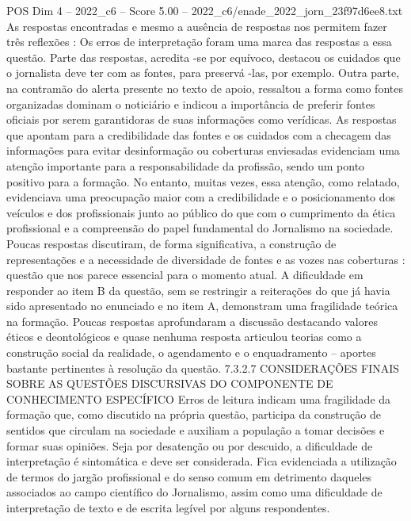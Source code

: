 \begin{textsample}{POS Dim 4 – 2022\_c6 – Score 5.00 – 2022\_c6/enade\_2022\_jorn\_23f97d6ee8.txt}
As respostas encontradas e mesmo a ausência de respostas nos permitem fazer três reflexões : Os erros de interpretação foram uma marca das respostas a essa questão.
Parte das respostas, acredita -se por equívoco, destacou os cuidados que o jornalista deve ter com as fontes, para preservá -las, por exemplo.
Outra parte, na contramão do alerta presente no texto de apoio, ressaltou a forma como fontes organizadas dominam o noticiário e indicou a importância de preferir fontes oficiais por serem garantidoras de suas informações como verídicas.
As respostas que apontam para a credibilidade das fontes e os cuidados com a checagem das informações para evitar desinformação ou coberturas enviesadas evidenciam uma atenção importante para a responsabilidade da profissão, sendo um ponto positivo para a formação.
No entanto, muitas vezes, essa atenção, como relatado, evidenciava uma preocupação maior com a credibilidade e o posicionamento dos veículos e dos profissionais junto ao público do que com o cumprimento da ética profissional e a compreensão do papel fundamental do Jornalismo na sociedade.
Poucas respostas discutiram, de forma significativa, a construção de representações e a necessidade de diversidade de fontes e as vozes nas coberturas : questão que nos parece essencial para o momento atual.
A dificuldade em responder ao item B da questão, sem se restringir a reiterações do que já havia sido apresentado no enunciado e no item A, demonstram uma fragilidade teórica na formação.
Poucas respostas aprofundaram a discussão destacando valores éticos e deontológicos e quase nenhuma resposta articulou teorias como a construção social da realidade, o agendamento e o enquadramento – aportes bastante pertinentes à resolução da questão. 7.3.2.7 CONSIDERAÇÕES FINAIS SOBRE AS QUESTÕES DISCURSIVAS DO COMPONENTE DE CONHECIMENTO ESPECÍFICO Erros de leitura indicam uma fragilidade da formação que, como discutido na própria questão, participa da construção de sentidos que circulam na sociedade e auxiliam a população a tomar decisões e formar suas opiniões.
Seja por desatenção ou por descuido, a dificuldade de interpretação é sintomática e deve ser considerada.
Fica evidenciada a utilização de termos do jargão profissional e do senso comum em detrimento daqueles associados ao campo científico do Jornalismo, assim como uma dificuldade de interpretação de texto e de escrita legível por alguns respondentes.

\end{textsample}
